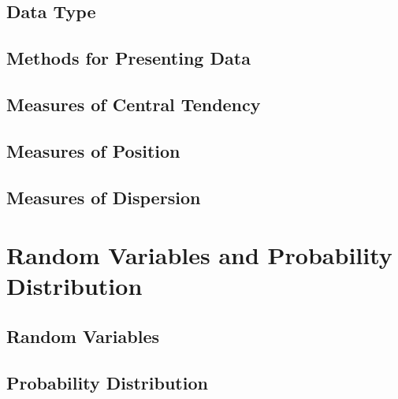 \documentclass[
	11pt, %
	handout,
]{beamer}
\begin{document}


\subsection{Data Type}


\subsection{Methods for Presenting Data}


\subsection{Measures of Central Tendency}


\subsection{Measures of Position}


\subsection{Measures of Dispersion}



\section{Random Variables and Probability Distribution}


\subsection{Random Variables}


\subsection{Probability Distribution}
\end{document}
